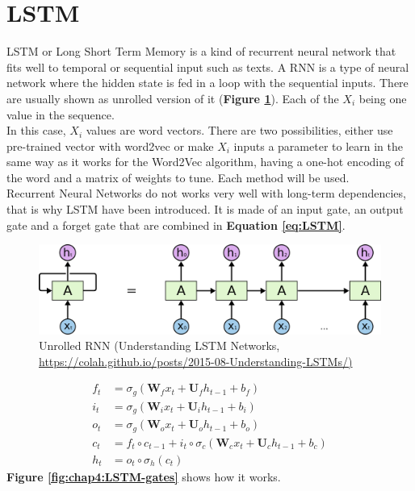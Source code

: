 \section{LSTM}
LSTM or Long Short Term Memory\cite{Hochreiter1997LongSM} is a kind of recurrent neural network that fits well to temporal or sequential input such as texts. A RNN is a type of neural network where the hidden state is fed in a loop with the sequential inputs. There are usually shown as unrolled version of it (\textbf{Figure \ref{fig:chap4:RNN_unroll}}). Each of the $X_i$ being one value in the sequence.\\
In this case, $X_i$ values are word vectors. There are two possibilities, either use pre-trained vector with word2vec or make $X_i$ inputs a parameter to learn in the same way as it works for the Word2Vec algorithm, having a one-hot encoding of the word and a matrix of weights to tune. Each method will be used. \\
Recurrent Neural Networks do not works very well with long-term dependencies, that is why LSTM have been introduced. It is made of an input gate, an output gate and a forget gate that are combined in \textbf{Equation \ref{eq:LSTM}}.
\begin{figure}
 \centering
 \includegraphics[width=\textwidth]{images/chapitre4/RNN-unrolled.png}
 \caption{Unrolled RNN (Understanding LSTM Networks, \url{https://colah.github.io/posts/2015-08-Understanding-LSTMs/)}}
 \label{fig:chap4:RNN_unroll}
\end{figure} 
\begin{align} \label{eq:LSTM}
 f_t &= \sigma_g(\mathbf{W}_f x_t + \mathbf{U}_fh_{t-1} + b_f)\\
 i_t &= \sigma_g(\mathbf{W}_i x_t + \mathbf{U}_ih_{t-1} + b_i)\\
 o_t &= \sigma_g(\mathbf{W}_o x_t + \mathbf{U}_oh_{t-1} + b_o)\\
 c_t &= f_t \circ c_{t-1} + i_t \circ \sigma_c(\mathbf{W}_cx_t + \mathbf{U}_c h_{t-1} + b_c)\\
 h_t &= o_t \circ \sigma_h (c_t)
\end{align}
\textbf{Figure \ref{fig:chap4:LSTM-gates}} shows how it works.
